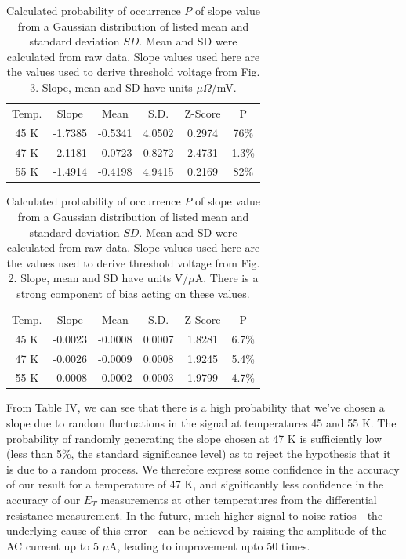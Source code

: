 \documentclass[aps,prl,nofootinbib,twocolumn,superscriptaddress,groupedaddress]{revtex4}  %
\begin{document}
\begin{table}[h]
\caption{\label{tab:table3} Calculated probability of occurrence $P$ of slope value from a Gaussian distribution of listed mean and standard deviation $SD$. Mean and SD were calculated from raw data. Slope values used here are the values used to derive threshold voltage from Fig. 3. Slope, mean and SD have units $\mu\Omega$/mV.}
\begin{ruledtabular}
\begin{tabular}{cccccc}
Temp. & Slope & Mean & S.D. & Z-Score & P \\
45 K & -1.7385 & -0.5341 & 4.0502 & 0.2974 & 76\%\\
47 K & -2.1181 & -0.0723 & 0.8272 & 2.4731 & 1.3\%\\
55 K & -1.4914 & -0.4198 & 4.9415 & 0.2169 & 82\%\\
\end{tabular}
\end{ruledtabular}
\end{table} 

\begin{table}[h]
\caption{\label{tab:table3} Calculated probability of occurrence $P$ of slope value from a Gaussian distribution of listed mean and standard deviation $SD$. Mean and SD were calculated from raw data. Slope values used here are the values used to derive threshold voltage from Fig. 2. Slope, mean and SD have units V/$\mu$A. There is a strong component of bias acting on these values.}
\begin{ruledtabular}
\begin{tabular}{cccccc}
Temp. & Slope & Mean & S.D. & Z-Score & P \\
45 K & -0.0023 & -0.0008 & 0.0007 & 1.8281 & 6.7\%\\
47 K & -0.0026 & -0.0009 & 0.0008 & 1.9245 & 5.4\%\\
55 K & -0.0008 & -0.0002 & 0.0003 & 1.9799 & 4.7\%\\
\end{tabular}
\end{ruledtabular}
\end{table} 

From Table IV, we can see that there is a high probability that we've chosen a slope due to random fluctuations in the signal at temperatures 45 and 55 K. The probability of randomly generating the slope chosen at 47 K is sufficiently low (less than 5\%, the standard significance level) as to reject the hypothesis that it is due to a random process. We therefore express some confidence in the accuracy of our result for a temperature of 47 K, and significantly less confidence in the accuracy of our $E_{T}$ measurements at other temperatures from the differential resistance measurement. In the future, much higher signal-to-noise ratios - the underlying cause of this error - can be achieved by raising the amplitude of the AC current up to 5 $\mu$A, leading to improvement upto 50 times.
\end{document}
